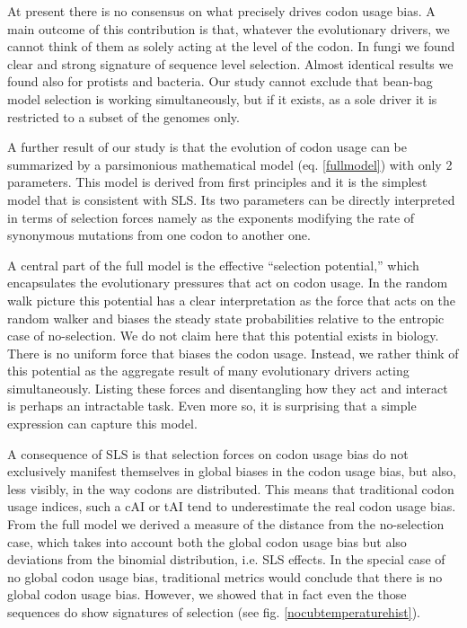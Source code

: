 \documentclass[a4paper,10pt]{paper}%
\begin{document}
At present there is no consensus on what precisely drives codon usage bias. A main outcome of this contribution is that, whatever the evolutionary drivers, we cannot think of them as solely acting at the level of the codon. In fungi we found clear and strong signature of sequence level selection. Almost identical results we found also for protists and bacteria.  Our study cannot exclude that bean-bag model selection is working simultaneously, but if it exists, as a sole driver it is restricted to a subset of the genomes only. 
\par
A further result of our  study is that the  evolution of codon usage can be summarized by a parsimonious mathematical model (eq. \ref{fullmodel}) with only  2 parameters. This model is derived from first principles and  it is  the  simplest  model  that is consistent with SLS.  Its two parameters can be  directly interpreted in terms of selection forces namely as the  exponents modifying the rate of synonymous mutations from one codon to another one. 
\par
A central part of the full model is the  effective ``selection potential,'' which encapsulates the evolutionary pressures that act on codon usage. In the random walk picture this potential has a clear interpretation as the force that acts on the random walker and biases the steady state probabilities relative to the entropic case of no-selection. We do not claim here that this potential exists in biology. There is no uniform force that biases the codon usage. Instead, we rather think of this potential as the aggregate result of many evolutionary drivers acting simultaneously. Listing these forces and disentangling how they act and interact is perhaps an intractable task. Even more so, it is surprising that a simple expression can capture  this model.       
\par
A consequence of SLS is that selection forces on codon usage bias do not exclusively manifest themselves in global biases in the codon usage bias, but  also, less visibly, in the way codons are distributed. This means that traditional codon usage indices, such a cAI or tAI tend to underestimate the real codon usage bias. From the full model we derived a measure of the distance from the no-selection case, which takes into account both the global codon usage bias but also deviations from the binomial distribution, i.e. SLS effects. In the special case of no global codon usage bias, traditional metrics would conclude that there is no global codon usage bias. However, we showed that  in fact even the those sequences do show signatures of selection (see fig. \ref{nocubtemperaturehist}). 
\end{document}
